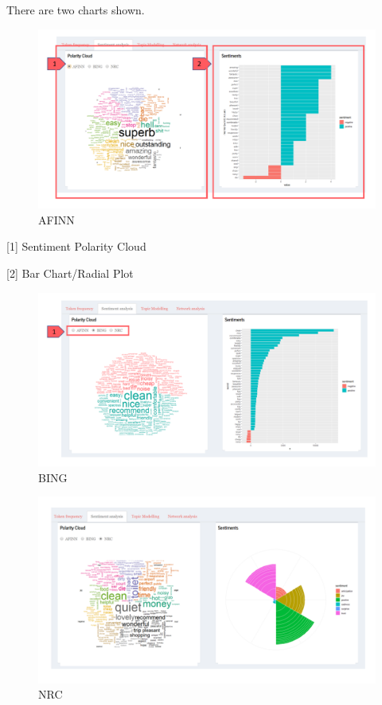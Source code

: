 \documentclass[
  12pt,
]{article}
\begin{document}
There are two charts shown.

\begin{figure}[H]

{\centering \includegraphics[width=0.95\linewidth]{images/sentimentchart} 

}

\caption{AFINN}\label{fig:unnamed-chunk-13}
\end{figure}

{[}1{]} Sentiment Polarity Cloud

{[}2{]} Bar Chart/Radial Plot

\begin{figure}[H]

{\centering \includegraphics[width=0.95\linewidth]{images/bingchart} 

}

\caption{BING}\label{fig:unnamed-chunk-14}
\end{figure}

\begin{figure}[H]

{\centering \includegraphics[width=0.95\linewidth]{images/nrcchart} 

}

\caption{NRC}\label{fig:unnamed-chunk-15}
\end{figure}
\end{document}
